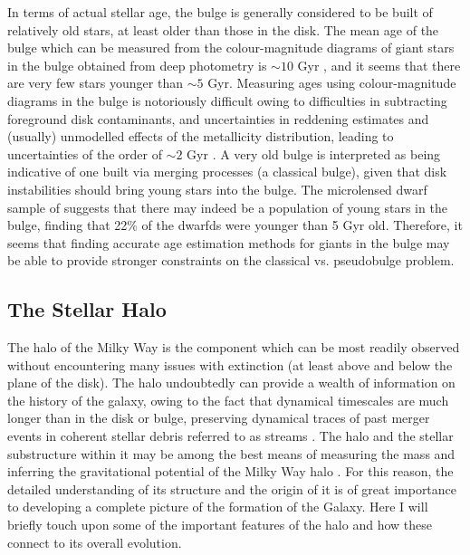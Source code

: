 In terms of actual stellar age, the bulge is generally considered to be built of relatively old stars, at least older than those in the disk. The mean age of the bulge which can be measured from the colour-magnitude diagrams of giant stars in the bulge obtained from deep photometry is $\sim 10$ Gyr \citep[e.g.][]{2003A&A...399..931Z,2013A&A...559A..98V}, and it seems that there are very few stars younger than $\sim 5$ Gyr\citep{2011ApJ...735...37C}. Measuring ages using colour-magnitude diagrams in the bulge is notoriously difficult owing to difficulties in subtracting foreground disk contaminants, and uncertainties in reddening estimates and (usually) unmodelled effects of the metallicity distribution, leading to uncertainties of the order of $\sim 2$ Gyr \citep{2016ASSL..418..199G}. A very old bulge is interpreted as being indicative of one built via merging processes (a classical bulge), given that disk instabilities should bring young stars into the bulge. The microlensed dwarf sample of \citet{2013A&A...549A.147B} suggests that there may indeed be a population of young stars in the bulge, finding that 22\% of the dwarfds were younger than 5 Gyr old. Therefore, it seems that finding accurate age estimation methods for giants in the bulge may be able to provide stronger constraints on the classical vs. pseudobulge problem.

\subsection{The Stellar Halo}
The halo of the Milky Way is the component which can be most readily observed without encountering many issues with extinction (at least above and below the plane of the disk). The halo undoubtedly can provide a wealth of information on the history of the galaxy, owing to the fact that dynamical timescales are much longer than in the disk or bulge, preserving dynamical traces of past merger events in coherent stellar debris referred to as streams \citep[e.g.][]{1996ApJ...465..278J}. The halo and the stellar substructure within it may be among the best means of measuring the mass and inferring the gravitational potential of the Milky Way halo \citep[e.g.][]{2014ApJ...794....4P}. For this reason, the detailed understanding of its structure and the origin of it is of great importance to developing a complete picture of the formation of the Galaxy. Here I will briefly touch upon some of the important features of the halo and how these connect to its overall evolution.

